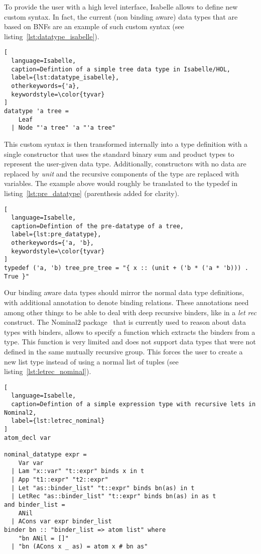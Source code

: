 To provide the user with a high level interface, Isabelle allows to define new custom syntax. In fact, the current (non binding aware) data types that are based on \acp{BNF} are an example of such custom syntax (see listing~\ref{lst:datatype_isabelle}).

\begin{minipage}{\textwidth}
\begin{lstlisting}[
  language=Isabelle,
  caption=Defintion of a simple tree data type in Isabelle/HOL,
  label={lst:datatype_isabelle},
  otherkeywords={'a},
  keywordstyle=\color{tyvar}
]
datatype 'a tree =
    Leaf
  | Node "'a tree" 'a "'a tree"
\end{lstlisting}
\end{minipage}

This custom syntax is then transformed internally into a type definition with a single constructor that uses the standard binary sum and product types to represent the user-given data type. Additionally, constructors with no data are replaced by \textit{unit} and the recursive components of the type are replaced with variables. The example above would roughly be translated to the typedef in listing~\ref{lst:pre_datatype} (parenthesis added for clarity).

\begin{minipage}{\textwidth}
\begin{lstlisting}[
  language=Isabelle,
  caption=Defintion of the pre-datatype of a tree,
  label={lst:pre_datatype},
  otherkeywords={'a, 'b},
  keywordstyle=\color{tyvar}
]
typedef ('a, 'b) tree_pre_tree = "{ x :: (unit + ('b * ('a * 'b))) . True }"
\end{lstlisting}
\end{minipage}

Our binding aware data types should mirror the normal data type definitions, with additional annotation to denote binding relations. These annotations need among other things to be able to deal with deep recursive binders, like in a \textit{let rec} construct. The Nominal2 package~\cite{Nominal2_package} that is currently used to reason about data types with binders, allows to specify a function which extracts the binders from a type. This function is very limited and does not support data types that were not defined in the same mutually recursive group. This forces the user to create a new list type instead of using a normal list of tuples (see listing~\ref{lst:letrec_nominal}).

\begin{lstlisting}[
  language=Isabelle,
  caption=Defintion of a simple expression type with recursive lets in Nominal2,
  label={lst:letrec_nominal}
]
atom_decl var

nominal_datatype expr =
    Var var
  | Lam "x::var" "t::expr" binds x in t
  | App "t1::expr" "t2::expr"
  | Let "as::binder_list" "t::expr" binds bn(as) in t
  | LetRec "as::binder_list" "t::expr" binds bn(as) in as t
and binder_list =
    ANil
  | ACons var expr binder_list
binder bn :: "binder_list => atom list" where
    "bn ANil = []"
  | "bn (ACons x _ as) = atom x # bn as"
\end{lstlisting}

